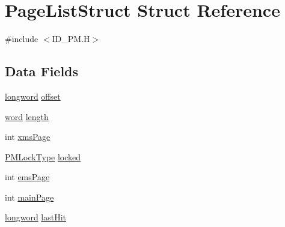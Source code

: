 \hypertarget{structPageListStruct}{
\section{PageListStruct Struct Reference}
\label{structPageListStruct}
}


{\ttfamily \#include $<$ID\_\-PM.H$>$}

\subsection*{Data Fields}
\begin{DoxyCompactItemize}
\item 
\hyperlink{ID__HEAD_8H_a8a9a7dd50c6fdb45dcdf0eb929479663}{longword} \hyperlink{structPageListStruct_a9b67eab88331155941372df93f50b643}{offset}
\item 
\hyperlink{ID__HEAD_8H_abad51e07ab6d26bec9f1f786c8d65bcd}{word} \hyperlink{structPageListStruct_a77f59888a56d0d4592acd4e1a80c9883}{length}
\item 
int \hyperlink{structPageListStruct_a57b442a1b1e2e08e5607930e36697d24}{xmsPage}
\item 
\hyperlink{ID__PM_8H_a470960f2645467be319a542ef1f65851}{PMLockType} \hyperlink{structPageListStruct_abf25d4d4feab9130ea49d1dbdf485673}{locked}
\item 
int \hyperlink{structPageListStruct_a0b6ebc3ddfc14d5c510a5e93fb3d59ff}{emsPage}
\item 
int \hyperlink{structPageListStruct_a64f05551b9c34348c49f4a175b9e4072}{mainPage}
\item 
\hyperlink{ID__HEAD_8H_a8a9a7dd50c6fdb45dcdf0eb929479663}{longword} \hyperlink{structPageListStruct_a9097befea1b690bf042b0dc216ecba94}{lastHit}
\end{DoxyCompactItemize}


